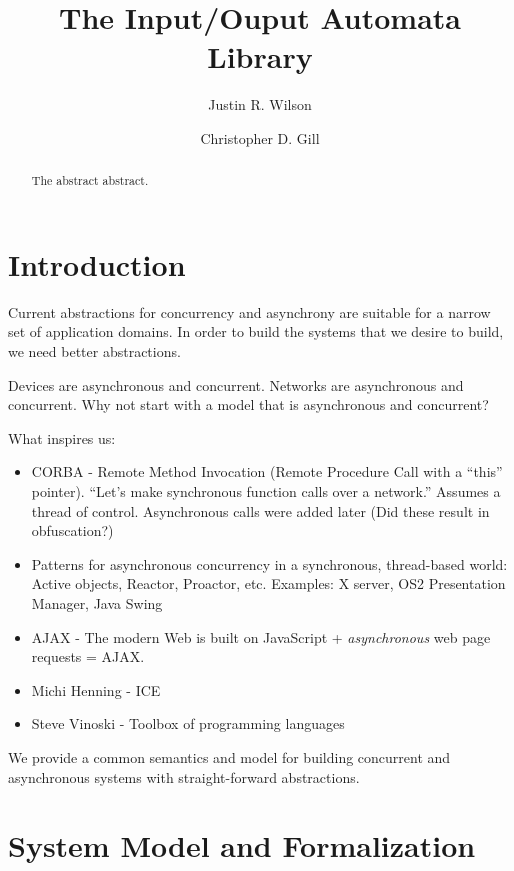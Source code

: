 \documentclass[letterpaper]{article}
\begin{document}
\title{The Input/Ouput Automata Library}
\author{Justin R. Wilson \and Christopher D. Gill}
\date{}

\maketitle

\begin{abstract}
The abstract abstract.
\end{abstract}

\section{Introduction}

Current abstractions for concurrency and asynchrony are suitable for a narrow set of application domains.
In order to build the systems that we desire to build, we need better abstractions.

Devices are asynchronous and concurrent.
Networks are asynchronous and concurrent.
Why not start with a model that is asynchronous and concurrent?

What inspires us:
\begin{itemize}
  \item CORBA - Remote Method Invocation (Remote Procedure Call with a ``this'' pointer).
    ``Let's make synchronous function calls over a network.''
    Assumes a thread of control.
    Asynchronous calls were added later (Did these result in obfuscation?)

  \item Patterns for asynchronous concurrency in a synchronous, thread-based world: Active objects, Reactor, Proactor, etc.
    Examples: X server, OS2 Presentation Manager, Java Swing

  \item AJAX - The modern Web is built on JavaScript + \emph{asynchronous} web page requests = AJAX.

  \item Michi Henning - ICE

  \item Steve Vinoski - Toolbox of programming languages

\end{itemize}

We provide a common semantics and model for building concurrent and asynchronous systems with straight-forward abstractions.

\section{System Model and Formalization}
\end{document}
